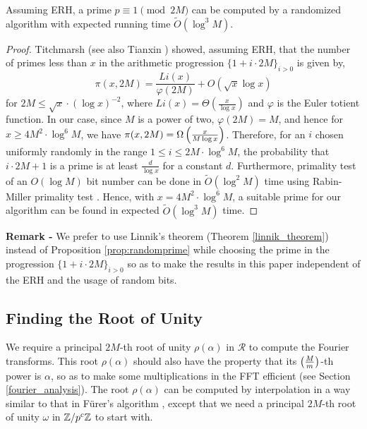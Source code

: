 \documentclass[11pt]{article}
\begin{document}
\begin{proposition} \label{prop:randomprime}
Assuming ERH, a prime $p\equiv 1\pmod{2M}$ can be computed by a
randomized algorithm with expected running time $\tilde{O}(\log^3 M)$.
\end{proposition}
\begin{proof}
Titchmarsh \cite{Titchmarsh} (see also Tianxin \cite{Tianxin})
showed, assuming ERH, that the number of primes less than $x$ in the
arithmetic progression $\{ 1 + i \cdot 2M\}_{i > 0}$ is given by,
\begin{equation*}
\pi(x,2M) = \frac{Li(x)}{\varphi(2M)} + O(\sqrt{x} \log x)
\end{equation*}
for $2M \leq \sqrt{x} \cdot (\log x)^{-2}$, where $Li(x) =
\Theta(\frac{x}{\log x})$ and $\varphi$ is the Euler totient
function. In our case, since $M$ is a power of two, $\varphi(2M) = M$,
and hence for $x \geq 4M^2 \cdot \log^6 M$, we have $\pi(x, 2M) =
\Omega\left(\frac{x}{M\log x}\right)$. Therefore, for an $i$ chosen
uniformly randomly in the range $1 \leq i \leq 2M \cdot \log^6 M$, the
probability that $i\cdot 2M + 1$ is a prime is at least $\frac{d}{\log
  x}$ for a constant $d$. Furthermore, primality test of an $O(\log
M)$ bit number can be done in $\tilde{O}(\log^2 M)$ time using
Rabin-Miller primality test \cite{M76, R80}. Hence, with $x = 4M^2
\cdot \log^6 M$, a suitable prime for our algorithm can be found in
expected $\tilde{O}(\log^3 M)$ time.
\end{proof}

\noindent \textbf{Remark - } We prefer to use Linnik's theorem (Theorem
\ref{linnik_theorem}) instead of Proposition \ref{prop:randomprime}
while choosing the prime in the progression $\{ 1 + i \cdot 2M\}_{i > 0}$
so as to make the results in this paper independent of the ERH and the usage
of random bits.

\subsection{Finding the Root of Unity}\label{root_section}

We require a principal $2M$-th root of unity $\rho(\alpha)$ in
$\mathcal{R}$ to compute the Fourier transforms. This root
$\rho(\alpha)$ should also have the property that its
$\left(\frac{M}{m}\right)$-th power is $\alpha$, so as to make some
multiplications in the FFT efficient (see Section
\ref{fourier_analysis}). The root $\rho(\alpha)$ can be computed by
interpolation in a way similar to that in F\"{u}rer's algorithm
\cite[Section 3]{F07}, except that we need a principal $2M$-th root of
unity $\omega$ in $\mathbb{Z}/p^c\mathbb{Z}$ to start with.
\end{document}
